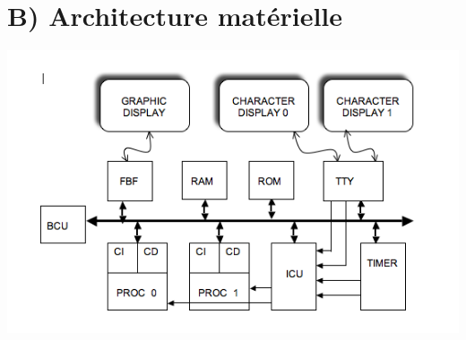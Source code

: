 \documentclass[10pt]{article}
\begin{document}
\section{B) Architecture matérielle}
\begin{center}
  \includegraphics[width=14cm]{tp6_topcell.png}
\end{center}
\end{document}
